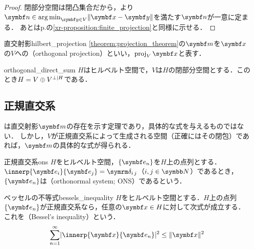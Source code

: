 \documentclass[../../main]{subfiles}
\begin{document}
\begin{proof}
  閉部分空間は閉凸集合だから，より\(\vect{n}\in\argmin_{\vect{y}\in V}\vnorm{\vect{x}-\vect{y}}\)を満たす\(\vect{n}\)が一意に定まる．
  あとはp.\pageref{xr-proposition:finite_projection}の\cref{xr-proposition:finite_projection}と同様に示せる．
\end{proof}

\begin{definition}{直交射影}{hilbert_projection}
  \cref{theorem:projection_theorem}の\(\vect{m}\)を\(\vect{x}\)の\(V\)への（orthogonal projection）といい，\(\proj_V\vect{x}\)と表す．
\end{definition}

\begin{proposition}{}{orthogonal_direct_sum}
  \(H\)はヒルベルト空間で，\(V\)は\(H\)の閉部分空間とする．このとき\(H=V\oplus\pcomp[H]{V}\)である．
\end{proposition}

\subsection{正規直交系}

は直交射影\(\vect{m}\)の存在を示す定理であり，具体的な式を与えるものではない．
しかし，\(V\)が正規直交系によって生成される空間（正確にはその閉包）であれば，\(\vect{m}\)の具体的な式が得られる．

\begin{definition}{正規直交系}{ons}
  \(H\)をヒルベルト空間，\(\seq{\vect{e}_n}\)を\(H\)上の点列とする．\(\innerp{\vect{e}_i}{\vect{e}_j}=\kdelta{i}{j}\)（\(i,j\in\numset{N}\)）であるとき，\(\seq{\vect{e}_n}\)は（orthonormal system; ONS）であるという．
\end{definition}

\begin{theorem}{ベッセルの不等式}{bessels_inequality}
  \(H\)をヒルベルト空間とする．\(H\)上の点列\(\seq{\vect{e}_n}\)が正規直交系なら，任意の\(\vect{x}\in H\)に対して次式が成立する．
  これを（Bessel's inequality）という．
  \begin{equation}
    \label{equation:bessels_inequality}
    \sum_{n=1}^\infty\abs{\innerp{\vect{x}}{\vect{e}_n}}^2 \leq \vnorm{\vect{x}}^2
  \end{equation}
\end{theorem}
\end{document}
